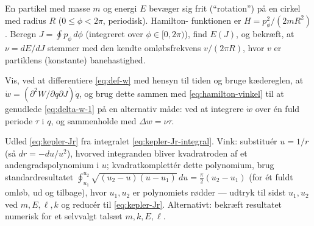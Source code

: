 \begin{opgave}
En partikel med masse $m$ og energi $E$ bevæger sig frit (``rotation'')
på en cirkel med radius $R$ ($0\leq\phi<2\pi$, periodisk). Hamilton-
funktionen er $H=p_\phi^2/(2mR^2)$. Beregn $J=\oint p_\phi\,d\phi$
(integreret over $\phi\in[0,2\pi)$), find $E(J)$, og bekræft, at
$\nu=dE/dJ$ stemmer med den kendte omløbsfrekvens $v/(2\pi R)$, hvor
$v$ er partiklens (konstante) banehastighed.
\end{opgave}

\begin{opgave}
Vis, ved at differentiere \eqref{eq:def-w} med hensyn til tiden og
bruge kædereglen, at $\dot w = (\partial^2W/\partial q\partial J)\dot q$,
og brug dette sammen med \eqref{eq:hamilton-vinkel} til at genudlede
\eqref{eq:delta-w-1} på en alternativ måde: ved at integrere $\dot w$
over én fuld periode $\tau$ i $q$, og sammenholde med
$\Delta w = \nu\tau$.
\end{opgave}

\begin{opgave}
Udled \eqref{eq:kepler-Jr} fra integralet \eqref{eq:kepler-Jr-integral}.
Vink: substituér $u=1/r$ (så $dr=-du/u^2$), hvorved integranden
bliver kvadratroden af et andengradspolynomium i $u$; kvadratkomplettér
dette polynomium, brug standardresultatet
$\oint_{u_1}^{u_2}\sqrt{(u_2-u)(u-u_1)}\,du = \tfrac{\pi}{2}(u_2-u_1)$
(for \'et fuldt omløb, ud og tilbage), hvor $u_1,u_2$ er
polynomiets rødder — udtryk til sidst $u_1,u_2$ ved $m,E,\ell,k$
og reducér til \eqref{eq:kepler-Jr}. Alternativt: bekræft resultatet
numerisk for et selvvalgt talsæt $m,k,E,\ell$.
\end{opgave}
